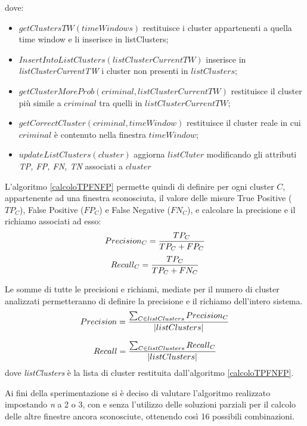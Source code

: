 dove:
\begin{itemize}
\item $getClustersTW(timeWindows)$ restituisce i cluster appartenenti a quella time window e li inserisce in listClusters;
\item $InsertIntoListClusters(listClusterCurrentTW)$ inserisce in \textit{listClusterCurrentTW} i cluster non presenti in $listClusters$;
\item $getClusterMoreProb(criminal,listClusterCurrentTW)$ restituisce il cluster più simile a $criminal$ tra quelli in $listClusterCurrentTW$;
\item $getCorrectCluster(criminal,timeWindow)$ restituisce il cluster reale in cui $criminal$ è contenuto nella finestra $timeWindow$;
\item $updateListClusters(cluster)$ aggiorna $listCluter$ modificando gli attributi \textit{TP, FP, FN, TN} associati a $cluster$ 
\end{itemize} 

L'algoritmo \ref{calcoloTPFNFP} permette quindi di definire per ogni cluster $C$, appartenente ad una finestra sconosciuta, il valore delle misure True Positive ($TP_C$), False Positive ($FP_C$) e False Negative ($FN_C$), e calcolare la precisione e il richiamo associati ad esso:
\begin{equation}
\centering
Precision_C = \frac{TP_C}{TP_C + FP_C}	
\end{equation}
\begin{equation}
\centering
Recall_C = \frac{TP_C}{TP_C + FN_C}
\end{equation}

Le somme di tutte le precisioni e richiami, mediate per il numero di cluster analizzati permetteranno di definire la precisione e il richiamo dell'intero sistema.
\begin{equation}
\centering
Precision = \frac{\sum_{C \in listClusters}  Precision_C}{|listClusters|}	 
\end{equation}

\begin{equation}
\centering
Recall = \frac{\sum_{C \in listClusters}  Recall_C}{|listClusters|}	 
\end{equation}
dove \textit{listClusters} è la lista di cluster restituita dall'algoritmo \ref{calcoloTPFNFP}.

Ai fini della sperimentazione si è deciso di valutare l'algoritmo realizzato impostando \textit{n} a 2 o 3, con e senza l'utilizzo delle soluzioni parziali per il calcolo delle altre finestre ancora sconosciute, ottenendo così 16 possibili combinazioni.

